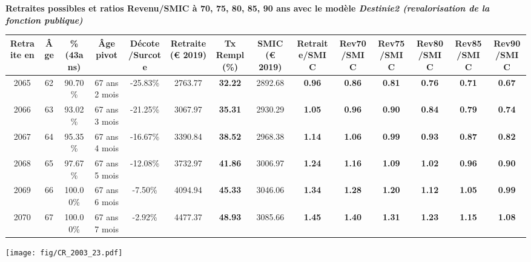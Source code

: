  \vspace{0.1cm} 
{\bf \noindent Retraites possibles et ratios Revenu/SMIC à 70, 75, 80, 85, 90 ans avec le modèle \emph{Destinie2 (revalorisation de la fonction publique)}}  
 
\begin{adjustbox}{max width=\textwidth} 
\begin{tabular}[htb]{|c|c||c|c|c||c|c||c||c|c|c|c|c|c|} 
\hline 
 Retraite en &  Âge &  \%(43ans) &  Âge pivot &  Décote/Surcote &  Retraite (\euro{} 2019) &  Tx Rempl(\%) &  SMIC (\euro{} 2019) &  Retraite/SMIC &  Rev70/SMIC &  Rev75/SMIC &  Rev80/SMIC &  Rev85/SMIC &  Rev90/SMIC \\ 
\hline \hline 
 2065 &  62 &  90.70\% &  67 ans 2 mois &  -25.83\% &  2763.77 &  {\bf 32.22} &  2892.68 &  {\bf {\color{red} 0.96}} &  {\bf {\color{red} 0.86}} &  {\bf {\color{red} 0.81}} &  {\bf {\color{red} 0.76}} &  {\bf {\color{red} 0.71}} &  {\bf {\color{red} 0.67}} \\ 
\hline 
 2066 &  63 &  93.02\% &  67 ans 3 mois &  -21.25\% &  3067.97 &  {\bf 35.31} &  2930.29 &  {\bf 1.05} &  {\bf {\color{red} 0.96}} &  {\bf {\color{red} 0.90}} &  {\bf {\color{red} 0.84}} &  {\bf {\color{red} 0.79}} &  {\bf {\color{red} 0.74}} \\ 
\hline 
 2067 &  64 &  95.35\% &  67 ans 4 mois &  -16.67\% &  3390.84 &  {\bf 38.52} &  2968.38 &  {\bf 1.14} &  {\bf 1.06} &  {\bf {\color{red} 0.99}} &  {\bf {\color{red} 0.93}} &  {\bf {\color{red} 0.87}} &  {\bf {\color{red} 0.82}} \\ 
\hline 
 2068 &  65 &  97.67\% &  67 ans 5 mois &  -12.08\% &  3732.97 &  {\bf 41.86} &  3006.97 &  {\bf 1.24} &  {\bf 1.16} &  {\bf 1.09} &  {\bf 1.02} &  {\bf {\color{red} 0.96}} &  {\bf {\color{red} 0.90}} \\ 
\hline 
 2069 &  66 &  100.00\% &  67 ans 6 mois &  -7.50\% &  4094.94 &  {\bf 45.33} &  3046.06 &  {\bf 1.34} &  {\bf 1.28} &  {\bf 1.20} &  {\bf 1.12} &  {\bf 1.05} &  {\bf {\color{red} 0.99}} \\ 
\hline 
 2070 &  67 &  100.00\% &  67 ans 7 mois &  -2.92\% &  4477.37 &  {\bf 48.93} &  3085.66 &  {\bf 1.45} &  {\bf 1.40} &  {\bf 1.31} &  {\bf 1.23} &  {\bf 1.15} &  {\bf 1.08} \\ 
\hline 
\hline 
\end{tabular} 
\end{adjustbox} 
 
 \vspace{0.1cm} 

 \begin{center}\texttt{[image: fig/CR\_2003\_23.pdf]}\end{center} \label{fig/CR_2003_23.pdf} 

